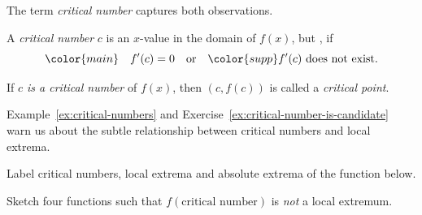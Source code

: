 \documentclass[../main.tex]{subfiles}
\begin{document}
\begin{definition} \label{def:critical-number}
  The term \emph{critical number} captures both observations.

  A \emph{critical number} \(c\) is an \(x\)-value in the domain of \(f(x)\), but , if
  \[
    {\color{main}\quad f'(c) = 0} \quad\text{or}\quad {\color{supp} f'(c) \text{ does not exist}}.
  \]
  
  If \emph{\(c\) is a critical number} of \(f(x)\), then \((c, f(c))\) is called a \emph{critical point}.

\end{definition}

Example~\ref{ex:critical-numbers} and Exercise~\ref{ex:critical-number-is-candidate} warn us about the subtle relationship between critical numbers and local extrema.

\begin{example} \label{ex:critical-numbers}
  Label critical numbers, local extrema and absolute extrema of the function below.

  \begin{center}
    
  \end{center}

  \blanks*
\end{example}

\begin{exercise} \label{ex:critical-number-is-candidate}
  Sketch four functions such that \(f(\text{critical number})\) is \emph{not} a local extremum.

  \begin{center}
    
    \hfill
    
    \hfill
    
    \hfill
    
  \end{center}
  \blanks*
\end{exercise}
\clearpage

\end{document}
